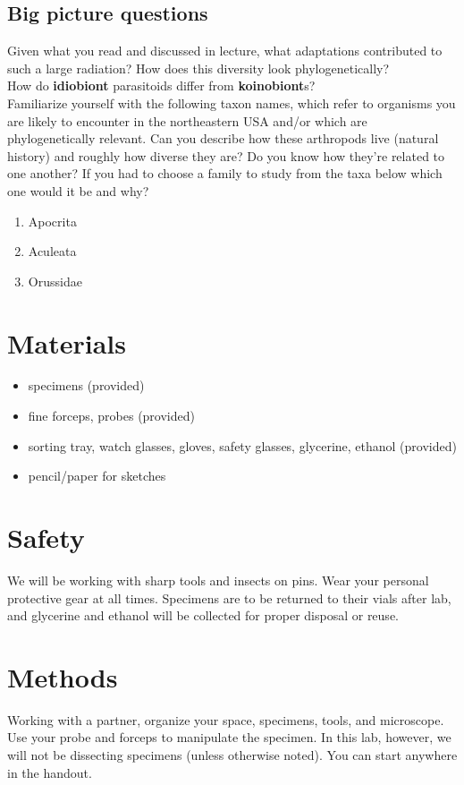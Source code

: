 \documentclass[letterpaper, 11pt]{article}
\begin{document}
\subsection*{Big picture questions}
Given what you read and discussed in lecture, what adaptations contributed to such a large radiation? How does this diversity look phylogenetically?\\

\noindent{}How do \textbf{idiobiont} parasitoids differ from \textbf{koinobiont}s?\\

\noindent{}Familiarize yourself with the following taxon names, which refer to organisms you are likely to encounter in the northeastern USA and/or which are phylogenetically relevant. Can you describe how these arthropods live (natural history) and roughly how diverse they are? Do you know how they're related to one another? If you had to choose a family to study from the taxa below which one would it be and why?

\begin{enumerate} 
\item Apocrita
\item Aculeata
\item Orussidae
\end{enumerate}

\section*{Materials}
\begin{itemize}
\item specimens (provided)
\item fine forceps, probes (provided)
\item sorting tray, watch glasses, gloves, safety glasses, glycerine, ethanol (provided)
\item pencil/paper for sketches
\end{itemize}

\section*{Safety}
We will be working with sharp tools and insects on pins. Wear your personal protective gear at all times. Specimens are to be returned to their vials after lab, and glycerine and ethanol will be collected for proper disposal or reuse.

\section*{Methods}
Working with a partner, organize your space, specimens, tools, and microscope. Use your probe and forceps to manipulate the specimen. In this lab, however, we will not be dissecting specimens (unless otherwise noted). You can start anywhere in the handout.
\end{document}
